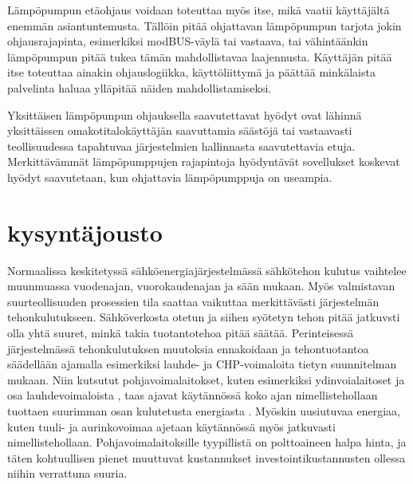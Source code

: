   Lämpöpumpun etäohjaus voidaan toteuttaa myös itse, mikä vaatii käyttäjältä enemmän asiantuntemusta. Tällöin pitää ohjattavan lämpöpumpun tarjota jokin ohjausrajapinta, esimerkiksi modBUS-väylä tai vastaava,  tai vähintäänkin lämpöpumpun pitää tukea tämän mahdollistavaa laajennusta. Käyttäjän pitää itse toteuttaa ainakin ohjauslogiikka, käyttöliittymä ja päättää minkälaista palvelinta haluaa ylläpitää näiden mahdollistamiseksi.

  Yksittäisen lämpöpunpun ohjauksella saavutettavat hyödyt ovat lähinnä yksittäissen omakotitalokäyttäjän saavuttamia säästöjä tai vastaavasti teollisuudessa tapahtuvaa järjestelmien hallinnasta saavutettavia etuja. Merkittävämmät lämpöpumppujen rajapintoja hyödyntävät sovellukset koskevat hyödyt saavutetaan, kun ohjattavia lämpöpumppuja on useampia.

\section{kysyntäjousto}

  Normaalissa keskitetyssä sähköenergiajärjestelmässä sähkötehon kulutus vaihtelee muunmuassa vuodenajan, vuorokaudenajan ja sään mukaan. Myös valmistavan suurteollisuuden prosessien tila saattaa vaikuttaa merkittävästi järjestelmän tehonkulutukseen. Sähköverkosta otetun ja siihen syötetyn tehon pitää jatkuvsti olla yhtä suuret, minkä takia tuotantotehoa pitää säätää. Perinteisessä järjestelmässä tehonkulutuksen muutoksia ennakoidaan ja tehontuotantoa säädellään ajamalla esimerkiksi lauhde- ja CHP-voimaloita tietyn suunnitelman mukaan. Niin kutsutut pohjavoimalaitokset, kuten esimerkiksi ydinvoialaitoset ja osa lauhdevoimaloista , taas ajavat käytännössä koko ajan nimellistehollaan tuottaen suurimman osan kulutetusta energiasta . Myöskin uusiutuvaa energiaa, kuten tuuli- ja aurinkovoimaa ajetaan käytännössä myös jatkuvasti nimellistehollaan. Pohjavoimalaitoksille tyypillistä on polttoaineen halpa hinta, ja täten kohtuullisen pienet muuttuvat kustannukset investointikustannusten ollessa niihin verrattuna suuria.

